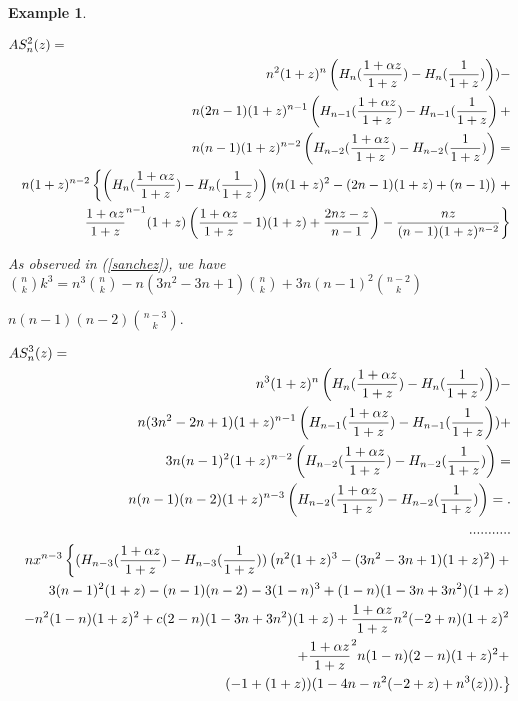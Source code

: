 \documentclass[a4paper,10pt,oneside]{article}
\newtheorem{example}{Example}[section]
\theoremstyle{definition}
\theoremstyle{remark}
\begin{document}
\begin{example}
\begin{description}
  \begin{eqnarray*}
 \lefteqn{AS_n^2(z)=}\\
 && \hspace{-50pt} n^2(1+z)^{n}\left(H_{n}(\frac{1+\alpha z}{1+z})-H_{n}(\frac{1}{1+z})\right))-\\
 &&n(2n-1)(1+z)^{n-1}\left(H_{n-1}(\frac{1+\alpha z}{1+z})-H_{n-1}(\frac{1}{1+z}\right)+\\
 &&  n(n-1)(1+z)^{n-2}\left(H_{n-2}(\frac{1+\alpha z}{1+z})-H_{n-2}(\frac{1}{1+z})\right)=\\
 &&n(1+z)^{n-2}\left\{\left(H_n(\frac{1+\alpha z}{1+z})-H_n(\frac{1}{1+z})\right)\left(n(1+z)^2-(2n-1)(1+z)+(n-1)\right)\right.+\\
 &&\left .\frac{1+\alpha z}{1+z}^{n-1}(1+z)\left(\frac{1+\alpha z}{1+z}-1)(1+z)+\frac{2nz-z}{n-1}\right)-\frac{nz}{(n-1)(1+z)^{n-2}}\right\}
 \end{eqnarray*}
\item [If $p=3$] As observed in (\ref{sanchez}), we have
   $\binom{n}{k}k^3= n^3\binom{n}{k}-n(3n^2-3n+1)\binom{n}{k} +3n(n-1)^2\binom{n-2}{k}$\par$n(n-1)(n-2)\binom{n-3}{k}.$\par 
   \begin{eqnarray*}
 \lefteqn{AS_n^3(z)=}\\
 && \hspace{-50pt} n^3(1+z)^{n}\left(H_{n}(\frac{1+\alpha z}{1+z})-H_{n}(\frac{1}{1+z})\right))-\\
 &&n(3n^2-2n+1)(1+z)^{n-1}\left(H_{n-1}(\frac{1+\alpha z}{1+z})-H_{n-1}(\frac{1}{1+z}\right))+\\
  && 3 n(n-1)^2(1+z)^{n-2}\left(H_{n-2}(\frac{1+\alpha z}{1+z})-H_{n-2}(\frac{1}{1+z})\right)=\\
 &&  n(n-1)(n-2)(1+z)^{n-3}\left(H_{n-2}(\frac{1+\alpha z}{1+z})-H_{n-2}(\frac{1}{1+z})\right)=.\\
 &&...........\\
 &&nx^{n-3}\left\{( H_{n-3}(\frac{1+\alpha z}{1+z})- H_{n-3}(\frac{1}{1+z}))\left(n^2(1+z)^3-(3n^2-3n+1)(1+z)^2\right)+ \right.\\
 &&\left. 3(n-1)^2(1+z)-(n-1)(n-2) -3(1-n)^3 +(1-n)(1-3n+3n^2)(1+z)\right.\\
 &&\left.-n^2(1-n)(1+z)^2+c(2-n)(1-3n+3n^2)(1+z)+\frac{1+\alpha z}{1+z}n^2(-2+n)(1+z)^2\right.\\
 &&\left.+\frac{1+\alpha z}{1+z}^2n(1-n)(2-n)(1+z)^2+\right.\\
 &&\left.(-1+(1+z))(1-4n-n^2(-2+z)+n^3(z))). \right\}\\
 \end{eqnarray*}

 \end{description}
 \end{example}
 
\end{document}
